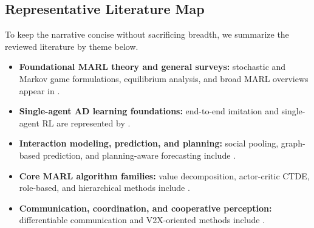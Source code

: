 \documentclass[12pt, a4paper]{article}
\begin{document}
\subsection{Representative Literature Map}
\label{sec:litmap}

To keep the narrative concise without sacrificing breadth, we summarize the
reviewed literature by theme below.

\begin{itemize}[leftmargin=*,itemsep=0.25em,topsep=0.3em]
  \item \textbf{Foundational MARL theory and general surveys:}
  stochastic and Markov game formulations, equilibrium analysis, and broad MARL
  overviews appear in \cite{shapley1953stochastic,littman1994markov,bernstein2002complexity,hu2003nash,busoniu2008comprehensive,lanctot2017unified,zhang2021multi,hernandez2019survey,tan1993multi,kraemer2016multi,foerster2018lola,vinyals2019alphastar,gupta2017cooperative,zhang2019global,de2020independent}.

  \item \textbf{Single-agent AD learning foundations:}
  end-to-end imitation and single-agent RL are represented by
  \cite{bojarski2016end,codevilla2018end,bansal2018chauffeur,ross2011reduction,sallab2017deep,mnih2015human,mnih2016asynchronous,schulman2017proximal,kahn2017uncertainty,chen2019model,kiran2021deep,hubmann2018automated}.

  \item \textbf{Interaction modeling, prediction, and planning:}
  social pooling, graph-based prediction, and planning-aware forecasting include
  \cite{alahi2016social,gupta2018social,lee2017desire,deo2018convolutional,gao2020vectornet,salzmann2020trajectron,liang2020lanegcn,zhao2020tnt,chai2019multipath,song2020pip,sadigh2016planning,fisac2019hierarchical,schwarting2019social,schwarting2021deep,fridovich2020efficient,deo2020trajectory}.

  \item \textbf{Core MARL algorithm families:}
  value decomposition, actor-critic CTDE, role-based, and hierarchical methods
  include \cite{sunehag2018value,rashid2018qmix,son2019qtran,mahajan2019maven,lowe2017multi,foerster2018counterfactual,yu2021surprising,kuba2021hatrpo,peng2021facmac,wang2021rode,wang2020roma,vezhnevets2017feudal,chu2020multi,wang2020shapley,su2021vdac}.

  \item \textbf{Communication, coordination, and cooperative perception:}
  differentiable communication and V2X-oriented methods include
  \cite{foerster2016learning,sukhbaatar2016learning,das2019tarmac,jiang2018learning,singh2019learning,kim2019learning,kim2019message,wang2021vbc,wang2020bandwidth,wang2020v2vnet,jiang2019graph,velickovic2018graph}.


\end{itemize}
\end{document}
